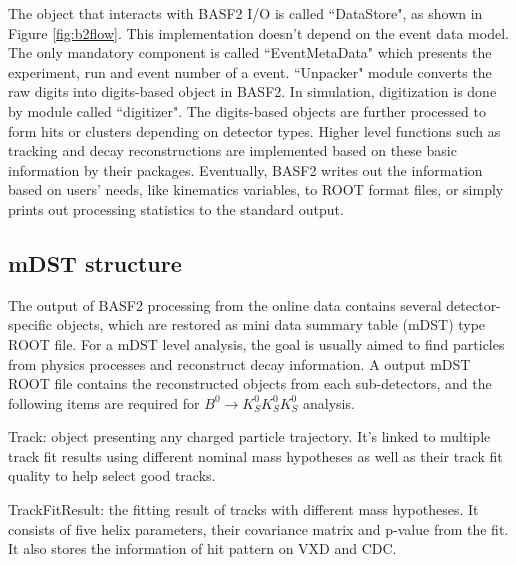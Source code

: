 The object that interacts with BASF2 I/O is called ``DataStore", as shown in Figure \ref{fig:b2flow}. This implementation doesn't depend on the event data model. The only mandatory component is called ``EventMetaData" which presents the experiment, run  and event number of a event. ``Unpacker" module converts the raw digits into digits-based object in BASF2. In simulation, digitization is done by module called ``digitizer". The digits-based objects are further processed to form hits or clusters depending on detector types. Higher level functions such as tracking and decay reconstructions are implemented based on these basic information by their packages. Eventually, BASF2 writes out the information based on users' needs, like kinematics variables, to ROOT format files, or simply prints out processing statistics to the standard output. 

\begin{comment}
In practice, BASF2 starts running when it checks there is at least one module specifying the number of events to be processed in a ``path"  from the ``steering file", then it reads in the information from DataStore in the input ROOT file, execute all the requested modules in the ``steering file" and return the time and number of events as information printed in standard output.
\end{comment}



\subsection{mDST structure}

The output of BASF2 processing from the online data contains several detector-specific objects, which are restored as mini data summary table (mDST) type ROOT file. For a mDST level analysis, the goal is usually aimed to find particles from physics processes and reconstruct decay information. A output mDST ROOT file contains the reconstructed objects from each sub-detectors, and the following items are required for $B^0 \to K_S^0  K_S^0  K_S^0$ analysis. 


\textbullet \space Track: object presenting any charged particle trajectory. It's linked to multiple track fit results using different nominal mass hypotheses as well as their track fit quality to help select good tracks.  

\textbullet \space TrackFitResult: the fitting result of tracks with different mass hypotheses. It consists of five helix parameters, their covariance matrix and p-value from the fit. It also stores the information of hit pattern on VXD and CDC. 

